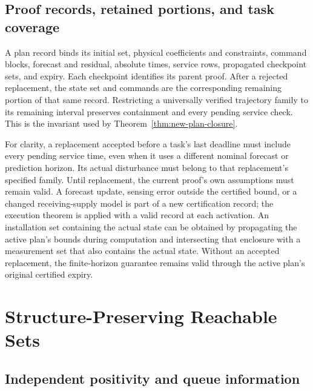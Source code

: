 \documentclass[journal,10pt]{IEEEtran}
\begin{document}
\subsection{Proof records, retained portions, and task coverage}

A plan record binds its initial set, physical coefficients and constraints,
command blocks, forecast and residual, absolute times, service rows,
propagated checkpoint sets, and expiry. Each checkpoint identifies its
parent proof. After a rejected replacement, the state set and commands are the corresponding
remaining portion of that same record. Restricting a universally
verified trajectory family to its remaining interval preserves containment
and every pending service check. This is the invariant used by
Theorem~\ref{thm:new-plan-closure}.

For clarity, a replacement accepted before a task's last deadline must
include every pending service time, even when it uses a different nominal
forecast or prediction horizon. Its actual disturbance must belong to that
replacement's specified family. Until replacement, the current proof's own
assumptions must remain valid. A forecast update, sensing error outside the
certified bound, or a changed receiving-supply model is part of a new
certification record; the execution theorem is applied with a valid record
at each activation. An installation set containing the actual state can be obtained by
propagating the active plan's bounds during computation and intersecting
that enclosure with a measurement set that also contains the actual state. Without an accepted replacement, the finite-horizon guarantee remains
valid through the active plan's original certified expiry.

\section{Structure-Preserving Reachable Sets}
\label{app:structure-proof}

\subsection{Independent positivity and queue information}
\end{document}
